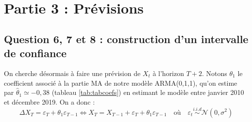 \documentclass[french]{article}
\begin{document}
\hypertarget{partie-3-pruxe9visions}{%
\section{Partie 3 : Prévisions}\label{partie-3-pruxe9visions}}

\hypertarget{question-6-7-et-8-construction-dun-intervalle-de-confiance}{%
\subsection{Question 6, 7 et 8 : construction d'un intervalle de confiance}\label{question-6-7-et-8-construction-dun-intervalle-de-confiance}}

On cherche désormais à faire une prévision de \(X_t\) à l'horizon \(T+2\).
Notons \(\theta_1\) le coefficient associé à la partie MA de notre modèle ARMA(0,1,1), qu'on estime par \(\widehat\theta_1\simeq -0,38\) (tableau \ref{tab:tabcoefs}) en estimant le modèle entre janvier 2010 et décembre 2019. On a donc :
\[
\Delta X_T = \varepsilon_T + \theta_1\varepsilon_{T-1}
\iff 
X_T = X_{T-1} + \varepsilon_T + \theta_1\varepsilon_{T-1}
\quad\text{où}\quad
\varepsilon_t\overset{i.i.d}\sim\mathcal N(0,\sigma^2)
\]
\end{document}
